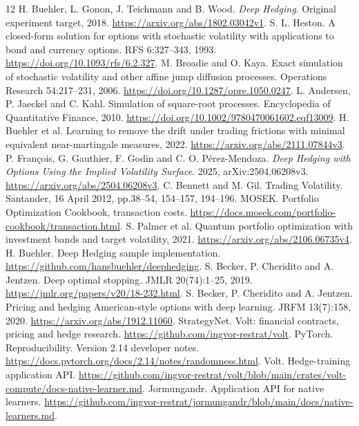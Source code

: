 \documentclass[8pt]{strategynet-journal}
\begin{document}
\begin{SNcolumns}
\begin{thebibliography}{12}
 H. Buehler, L. Gonon, J. Teichmann and B. Wood.
\emph{Deep Hedging}. Original experiment target, 2018.
\url{https://arxiv.org/abs/1802.03042v1}.
 S. L. Heston. A closed-form solution for options with stochastic
volatility with applications to bond and currency options. RFS 6:327--343, 1993.
\url{https://doi.org/10.1093/rfs/6.2.327}.
 M. Broadie and O. Kaya. Exact simulation of stochastic volatility
and other affine jump diffusion processes. Operations Research 54:217--231, 2006.
\url{https://doi.org/10.1287/opre.1050.0247}.
 L. Andersen, P. Jaeckel and C. Kahl. Simulation of square-root
processes. Encyclopedia of Quantitative Finance, 2010.
\url{https://doi.org/10.1002/9780470061602.eqf13009}.
 H. Buehler et al. Learning to remove the drift under trading
frictions with minimal equivalent near-martingale measures, 2022.
\url{https://arxiv.org/abs/2111.07844v3}.
 P. Fran\c{c}ois, G. Gauthier, F. Godin and C. O. P\'erez-Mendoza. \emph{Deep Hedging with Options Using the Implied Volatility Surface}. 2025, arXiv:2504.06208v3. \url{https://arxiv.org/abs/2504.06208v3}.
 C. Bennett and M. Gil. Trading Volatility. Santander, 16 April
2012, pp.38--54, 154--157, 194--196.
 MOSEK. Portfolio Optimization Cookbook, transaction costs.
\url{https://docs.mosek.com/portfolio-cookbook/transaction.html}.
 S. Palmer et al. Quantum portfolio optimization with investment
bands and target volatility, 2021. \url{https://arxiv.org/abs/2106.06735v4}.
 H. Buehler. Deep Hedging sample implementation.
\url{https://github.com/hansbuehler/deephedging}.
 S. Becker, P. Cheridito and A. Jentzen. Deep optimal stopping.
JMLR 20(74):1--25, 2019.
\url{https://jmlr.org/papers/v20/18-232.html}.
 S. Becker, P. Cheridito and A. Jentzen. Pricing and hedging
American-style options with deep learning. JRFM 13(7):158, 2020.
\url{https://arxiv.org/abs/1912.11060}.
 StrategyNet. Volt: financial contracts, pricing and hedge research.
\url{https://github.com/ingvor-restrat/volt}.
 PyTorch. Reproducibility. Version 2.14 developer notes.
\url{https://docs.pytorch.org/docs/2.14/notes/randomness.html}.
 Volt. Hedge-training application API.
\url{https://github.com/ingvor-restrat/volt/blob/main/crates/volt-compute/docs-native-learner.md}.
 Jormungandr. Application API for native learners.
\url{https://github.com/ingvor-restrat/jormungandr/blob/main/docs/native-learners.md}.
\end{thebibliography}
\end{SNcolumns}
\end{document}
